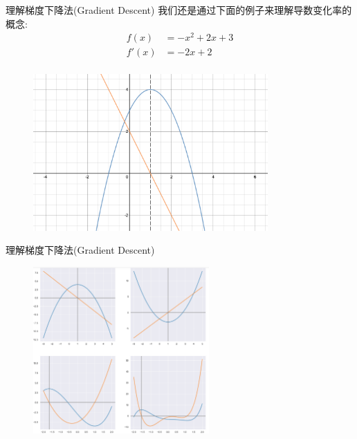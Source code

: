 \documentclass[handout]{ctexbeamer}
\begin{document}
\begin{frame}{理解梯度下降法(Gradient Descent)}
我们还是通过下面的例子来理解导数变化率的概念:
\begin{align*}
	f(x) & = -x^2 + 2x + 3 \\
	f'(x) & = -2x + 2 \\
\end{align*}
\begin{figure}[H]
	\centering
	\includegraphics[width=0.8\textwidth]{fig/C2preGrades}
\end{figure}
\end{frame}

\begin{frame}{理解梯度下降法(Gradient Descent)}
\begin{figure}[H]
	\centering
	\includegraphics[width=0.6\textwidth]{fig/C2preGd2}
\end{figure}	
\end{frame}
\end{document}
